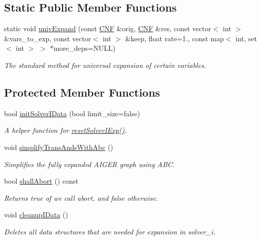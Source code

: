 \subsection*{Static Public Member Functions}
\begin{DoxyCompactItemize}
\item 
static void \hyperlink{classUnivExpander_adbc9898ad3b1aac28869c9b83c228816}{univ\-Expand} (const \hyperlink{classCNF}{C\-N\-F} \&orig, \hyperlink{classCNF}{C\-N\-F} \&res, const vector$<$ int $>$ \&vars\-\_\-to\-\_\-exp, const vector$<$ int $>$ \&keep, float rate=1., const map$<$ int, set$<$ int $>$ $>$ $\ast$more\-\_\-deps=N\-U\-L\-L)
\begin{DoxyCompactList}\small\item\em The standard method for universal expansion of certain variables. \end{DoxyCompactList}\end{DoxyCompactItemize}
\subsection*{Protected Member Functions}
\begin{DoxyCompactItemize}
\item 
bool \hyperlink{classUnivExpander_a87f2309e7e1d511d9539872b08814c40}{init\-Solver\-I\-Data} (bool limit\-\_\-size=false)
\begin{DoxyCompactList}\small\item\em A helper function for \hyperlink{classUnivExpander_a1d6935778cefc0b441db0d7f16933a48}{reset\-Solver\-I\-Exp()}. \end{DoxyCompactList}\item 
void \hyperlink{classUnivExpander_ab15bca765ef574d7e7d22f565444451a}{simplify\-Trans\-Ands\-With\-Abc} ()
\begin{DoxyCompactList}\small\item\em Simplifies the fully expanded A\-I\-G\-E\-R graph using A\-B\-C. \end{DoxyCompactList}\item 
bool \hyperlink{classUnivExpander_a309bb0771b1399cfd7480d0c5c5447fc}{shall\-Abort} () const 
\begin{DoxyCompactList}\small\item\em Returns true of we call abort, and false otherwise. \end{DoxyCompactList}\item 
void \hyperlink{classUnivExpander_a9c0788526dcb1f26433a981b89b2b942}{cleanup\-I\-Data} ()
\begin{DoxyCompactList}\small\item\em Deletes all data structures that are needed for expansion in solver\-\_\-i. \end{DoxyCompactList}\end{DoxyCompactItemize}
